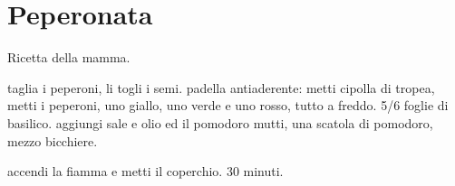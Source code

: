 \section{Peperonata}

Ricetta della mamma.
\generalRecipeInfos{}

taglia i peperoni, li togli i semi.
padella antiaderente: metti cipolla di tropea, metti i peperoni, uno giallo, uno verde e uno rosso, tutto a freddo. 5/6 foglie di basilico.
aggiungi sale e olio ed il pomodoro mutti, una scatola di pomodoro, mezzo bicchiere.

accendi la fiamma e metti il coperchio. 30 minuti.